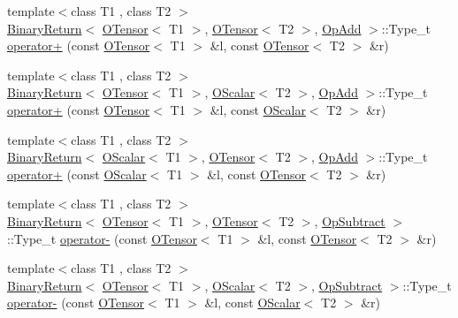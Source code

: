 \begin{DoxyCompactItemize}
\item 
{\footnotesize template$<$class T1 , class T2 $>$ }\\\mbox{\hyperlink{structENSEM_1_1BinaryReturn}{Binary\+Return}}$<$ \mbox{\hyperlink{classENSEM_1_1OTensor}{O\+Tensor}}$<$ T1 $>$, \mbox{\hyperlink{classENSEM_1_1OTensor}{O\+Tensor}}$<$ T2 $>$, \mbox{\hyperlink{structENSEM_1_1OpAdd}{Op\+Add}} $>$\+::Type\+\_\+t \mbox{\hyperlink{group__obstensor_gad61499ec3fe572c419aa5143ef37d965}{operator+}} (const \mbox{\hyperlink{classENSEM_1_1OTensor}{O\+Tensor}}$<$ T1 $>$ \&l, const \mbox{\hyperlink{classENSEM_1_1OTensor}{O\+Tensor}}$<$ T2 $>$ \&r)
\item 
{\footnotesize template$<$class T1 , class T2 $>$ }\\\mbox{\hyperlink{structENSEM_1_1BinaryReturn}{Binary\+Return}}$<$ \mbox{\hyperlink{classENSEM_1_1OTensor}{O\+Tensor}}$<$ T1 $>$, \mbox{\hyperlink{classENSEM_1_1OScalar}{O\+Scalar}}$<$ T2 $>$, \mbox{\hyperlink{structENSEM_1_1OpAdd}{Op\+Add}} $>$\+::Type\+\_\+t \mbox{\hyperlink{group__obstensor_gad2c9b97ae39bad4adefe3d2f480c0eb6}{operator+}} (const \mbox{\hyperlink{classENSEM_1_1OTensor}{O\+Tensor}}$<$ T1 $>$ \&l, const \mbox{\hyperlink{classENSEM_1_1OScalar}{O\+Scalar}}$<$ T2 $>$ \&r)
\item 
{\footnotesize template$<$class T1 , class T2 $>$ }\\\mbox{\hyperlink{structENSEM_1_1BinaryReturn}{Binary\+Return}}$<$ \mbox{\hyperlink{classENSEM_1_1OScalar}{O\+Scalar}}$<$ T1 $>$, \mbox{\hyperlink{classENSEM_1_1OTensor}{O\+Tensor}}$<$ T2 $>$, \mbox{\hyperlink{structENSEM_1_1OpAdd}{Op\+Add}} $>$\+::Type\+\_\+t \mbox{\hyperlink{group__obstensor_ga182db37f6b2f7005ba76d65458ac5424}{operator+}} (const \mbox{\hyperlink{classENSEM_1_1OScalar}{O\+Scalar}}$<$ T1 $>$ \&l, const \mbox{\hyperlink{classENSEM_1_1OTensor}{O\+Tensor}}$<$ T2 $>$ \&r)
\item 
{\footnotesize template$<$class T1 , class T2 $>$ }\\\mbox{\hyperlink{structENSEM_1_1BinaryReturn}{Binary\+Return}}$<$ \mbox{\hyperlink{classENSEM_1_1OTensor}{O\+Tensor}}$<$ T1 $>$, \mbox{\hyperlink{classENSEM_1_1OTensor}{O\+Tensor}}$<$ T2 $>$, \mbox{\hyperlink{structENSEM_1_1OpSubtract}{Op\+Subtract}} $>$\+::Type\+\_\+t \mbox{\hyperlink{group__obstensor_gacbd7414e163d7986e5bcfb720e77b733}{operator-\/}} (const \mbox{\hyperlink{classENSEM_1_1OTensor}{O\+Tensor}}$<$ T1 $>$ \&l, const \mbox{\hyperlink{classENSEM_1_1OTensor}{O\+Tensor}}$<$ T2 $>$ \&r)
\item 
{\footnotesize template$<$class T1 , class T2 $>$ }\\\mbox{\hyperlink{structENSEM_1_1BinaryReturn}{Binary\+Return}}$<$ \mbox{\hyperlink{classENSEM_1_1OTensor}{O\+Tensor}}$<$ T1 $>$, \mbox{\hyperlink{classENSEM_1_1OScalar}{O\+Scalar}}$<$ T2 $>$, \mbox{\hyperlink{structENSEM_1_1OpSubtract}{Op\+Subtract}} $>$\+::Type\+\_\+t \mbox{\hyperlink{group__obstensor_ga795d9d1bc036d1f9ddcab90e55085d67}{operator-\/}} (const \mbox{\hyperlink{classENSEM_1_1OTensor}{O\+Tensor}}$<$ T1 $>$ \&l, const \mbox{\hyperlink{classENSEM_1_1OScalar}{O\+Scalar}}$<$ T2 $>$ \&r)

\end{DoxyCompactItemize}
